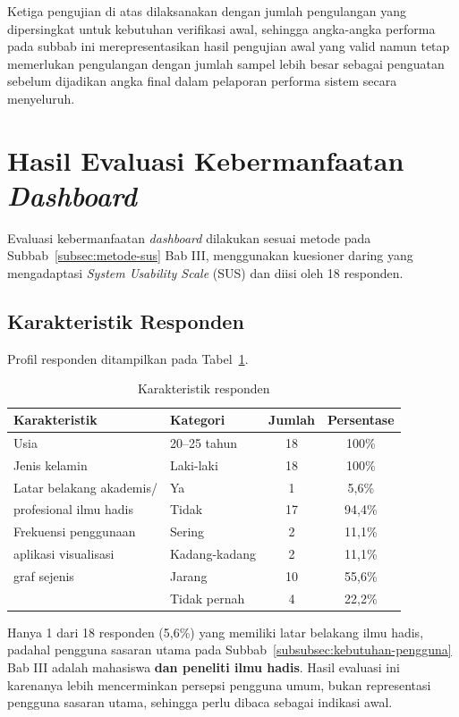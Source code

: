 Ketiga pengujian di atas dilaksanakan dengan jumlah pengulangan yang dipersingkat untuk kebutuhan verifikasi awal, sehingga angka-angka performa pada subbab ini merepresentasikan hasil pengujian awal yang valid namun tetap memerlukan pengulangan dengan jumlah sampel lebih besar sebagai penguatan sebelum dijadikan angka final dalam pelaporan performa sistem secara menyeluruh.

\section{Hasil Evaluasi Kebermanfaatan \textit{Dashboard}}
\label{sec:hasil-evaluasi-sus}
Evaluasi kebermanfaatan \textit{dashboard} dilakukan sesuai metode pada Subbab~\ref{subsec:metode-sus} Bab III, menggunakan kuesioner daring yang mengadaptasi \textit{System Usability Scale} (SUS) dan diisi oleh 18 responden.

\subsection{Karakteristik Responden}
Profil responden ditampilkan pada Tabel~\ref{tab:profil-responden}.

\begin{table}[H]
\centering
\caption{Karakteristik responden}
\label{tab:profil-responden}
\renewcommand{\arraystretch}{1.3}
\begin{tabular}{|l|l|c|c|}
\hline
\textbf{Karakteristik} & \textbf{Kategori} & \textbf{Jumlah} & \textbf{Persentase} \\
\hline
Usia & 20--25 tahun & 18 & 100\% \\
\hline
Jenis kelamin & Laki-laki & 18 & 100\% \\
\hline
Latar belakang akademis/ & Ya & 1 & 5,6\% \\
profesional ilmu hadis & Tidak & 17 & 94,4\% \\
\hline
Frekuensi penggunaan & Sering & 2 & 11,1\% \\
aplikasi visualisasi & Kadang-kadang & 2 & 11,1\% \\
graf sejenis & Jarang & 10 & 55,6\% \\
 & Tidak pernah & 4 & 22,2\% \\
\hline
\end{tabular}
\end{table}

Hanya 1 dari 18 responden (5,6\%) yang memiliki latar belakang ilmu hadis, padahal pengguna sasaran utama pada Subbab~\ref{subsubsec:kebutuhan-pengguna} Bab III adalah mahasiswa \textbf{dan peneliti ilmu hadis}. Hasil evaluasi ini karenanya lebih mencerminkan persepsi pengguna umum, bukan representasi pengguna sasaran utama, sehingga perlu dibaca sebagai indikasi awal.

